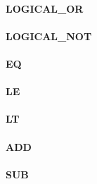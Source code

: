 \documentclass[12pt,a4paper]{article}
\begin{document}
\vspace{2em}\begin{minipage}{\textwidth}
\paragraph{LOGICAL\_OR}
\end{minipage}

\vspace{2em}\begin{minipage}{\textwidth}
\paragraph{LOGICAL\_NOT}
\end{minipage}

\vspace{2em}\begin{minipage}{\textwidth}
\paragraph{EQ}
\end{minipage}

\vspace{2em}\begin{minipage}{\textwidth}
\paragraph{LE}
\end{minipage}

\vspace{2em}\begin{minipage}{\textwidth}
\paragraph{LT}
\end{minipage}

\vspace{2em}\begin{minipage}{\textwidth}
\paragraph{ADD}
\end{minipage}

\vspace{2em}\begin{minipage}{\textwidth}
\paragraph{SUB}
\end{minipage}
\end{document}
